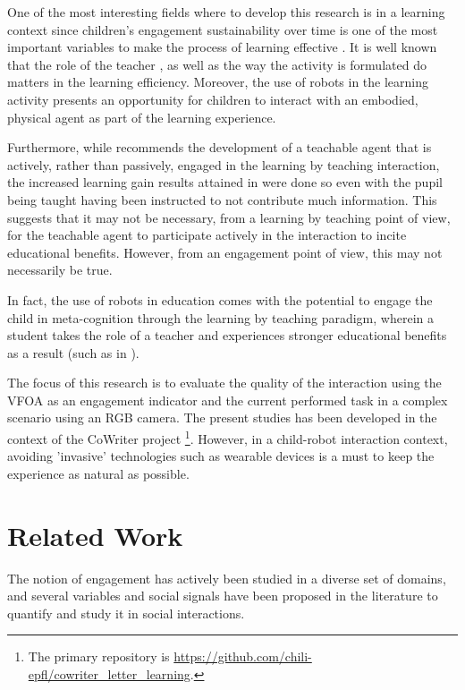 \documentclass{sig-alternate}
\begin{document}
One of the most interesting fields where to develop this research is in a learning context since children's engagement sustainability over time is one of the most important variables to make
the process of learning effective \cite{Umbach}. It is well known that the role of the teacher \cite{smith2005pedagogies}, as well as the way the activity is formulated do matters in the learning efficiency. Moreover, the use of robots in the learning activity presents an opportunity for children
to interact with an embodied, physical agent as part of the learning experience. 

Furthermore, while \cite{zhao2012learning} recommends the development of a teachable agent that is actively, rather than passively, engaged in the learning by teaching interaction, the increased learning gain results attained in \cite{okita2006observation} were done so even with the pupil being taught having been instructed to not contribute much information. This suggests that it may not be necessary, from a learning by teaching point of view, for the teachable agent to participate actively in the interaction to incite educational benefits. However, from an engagement point of view, this may not necessarily be true.

In fact, the use of robots in education comes with the potential to engage the child in meta-cognition through the learning by teaching paradigm, wherein a student takes the role of
a teacher and experiences stronger educational benefits as a result (such as in \cite{Palinscar1984}).

The focus of this research is to evaluate the quality of the interaction using the VFOA as an engagement indicator and the current performed task in a complex scenario using an RGB camera. The present studies has been developed in the context of the CoWriter project \footnote{The primary repository is \url{https://github.com/chili-epfl/cowriter_letter_learning}.}. However, in a child-robot interaction context, avoiding 'invasive' technologies such as wearable devices is a must to keep the experience as natural as possible. 

\section{Related Work}

The notion of engagement has actively been studied in a diverse set of domains, and several variables and social signals have been proposed in the literature to quantify and study it in social interactions.
\end{document}

